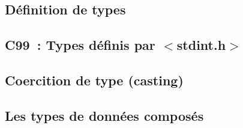 









\subsection*{Définition de types}



\subsection*{C99~: Types définis par $<$stdint.h$>$}







\subsection*{Coercition de type (casting)}















\subsection*{Les types de données composés}










































